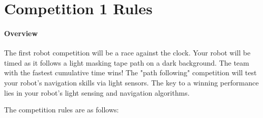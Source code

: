 
\section{Competition 1 Rules}

\paragraph{Overview}The first robot competition will be a race against the clock. Your robot will be timed as it follows a light masking tape path on a dark background. The team with the fastest cumulative time wins!
The "path following" competition will test your robot's navigation skills via light sensors. The key to a winning performance lies in your robot's light sensing and navigation algorithms.


The competition rules are as follows:

